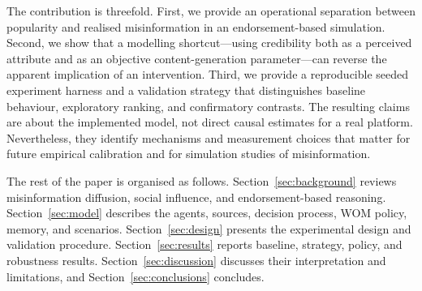 The contribution is threefold. First, we provide an operational separation between popularity and realised misinformation in an endorsement-based simulation. Second, we show that a modelling shortcut---using credibility both as a perceived attribute and as an objective content-generation parameter---can reverse the apparent implication of an intervention. Third, we provide a reproducible seeded experiment harness and a validation strategy that distinguishes baseline behaviour, exploratory ranking, and confirmatory contrasts. The resulting claims are about the implemented model, not direct causal estimates for a real platform. Nevertheless, they identify mechanisms and measurement choices that matter for future empirical calibration and for simulation studies of misinformation.

The rest of the paper is organised as follows. Section~\ref{sec:background} reviews misinformation diffusion, social influence, and endorsement-based reasoning. Section~\ref{sec:model} describes the agents, sources, decision process, WOM policy, memory, and scenarios. Section~\ref{sec:design} presents the experimental design and validation procedure. Section~\ref{sec:results} reports baseline, strategy, policy, and robustness results. Section~\ref{sec:discussion} discusses their interpretation and limitations, and Section~\ref{sec:conclusions} concludes.
